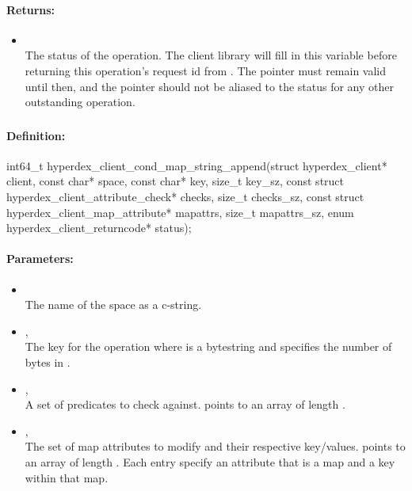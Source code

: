 \paragraph{Returns:}
\begin{itemize}[noitemsep]
\item {}\\
The status of the operation.  The client library will fill in this variable before returning this operation's request id from .  The pointer must remain valid until then, and the pointer should not be aliased to the status for any other outstanding operation.
\end{itemize}

\pagebreak
\subsubsection{}
\label{api:c:cond_map_string_append}


\paragraph{Definition:}
\begin{ccode}
int64_t hyperdex_client_cond_map_string_append(struct hyperdex_client* client,
        const char* space,
        const char* key, size_t key_sz,
        const struct hyperdex_client_attribute_check* checks, size_t checks_sz,
        const struct hyperdex_client_map_attribute* mapattrs, size_t mapattrs_sz,
        enum hyperdex_client_returncode* status);
\end{ccode}

\paragraph{Parameters:}
\begin{itemize}[noitemsep]
\item {}\\
The name of the space as a c-string.
\item {}, \\
The key for the operation where  is a bytestring and  specifies the number of bytes in .
\item {}, \\
A set of predicates to check against.   points to an array of length .
\item {}, \\
The set of map attributes to modify and their respective key/values.   points to an array of length .  Each entry specify an attribute that is a map and a key within that map.
\end{itemize}

